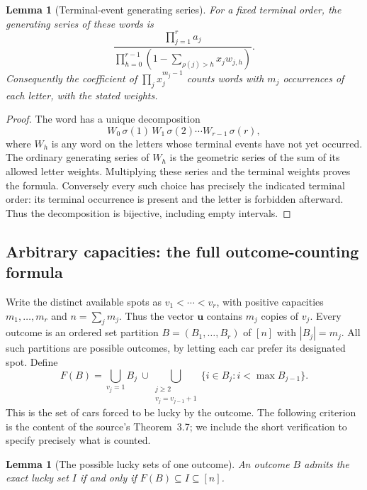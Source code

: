 \documentclass[11pt,a4paper]{article}
\newtheorem{lemma}[theorem]{Lemma}
\theoremstyle{definition}
\theoremstyle{remark}
\begin{document}
\begin{lemma}[Terminal-event generating series]
For a fixed terminal order, the generating series of these words is
\[
 \frac{\prod_{j=1}^r a_j}
 {\displaystyle\prod_{h=0}^{r-1}
       \left(1-\sum_{\rho(j)>h}x_jw_{j,h}\right)}.
\]
Consequently the coefficient of $\prod_jx_j^{m_j-1}$ counts words
with $m_j$ occurrences of each letter, with the stated weights.
\end{lemma}

\begin{proof}
The word has a unique decomposition
\[
 W_0\,\sigma(1)\,W_1\,\sigma(2)\cdots
 W_{r-1}\,\sigma(r),
\]
where $W_h$ is any word on the letters whose terminal events have not
yet occurred. The ordinary generating series of $W_h$ is the geometric
series of the sum of its allowed letter weights. Multiplying these
series and the terminal weights proves the formula. Conversely every
such choice has precisely the indicated terminal order: its terminal
occurrence is present and the letter is forbidden afterward. Thus the
decomposition is bijective, including empty intervals.
\end{proof}

\subsection{Arbitrary capacities: the full outcome-counting formula}

Write the distinct available spots as $v_1<\cdots<v_r$, with positive
capacities $m_1,\ldots,m_r$ and $n=\sum_jm_j$. Thus the vector
$\boldsymbol u$ contains $m_j$ copies of $v_j$. Every outcome is an
ordered set partition $B=(B_1,\ldots,B_r)$ of $[n]$ with $|B_j|=m_j$.
All such partitions are possible outcomes, by letting each car prefer
its designated spot. Define
\[
 F(B)=\bigcup_{v_j=1} B_j\ \cup
 \bigcup_{\substack{j\ge2\\v_j=v_{j-1}+1}}
       \{i\in B_j:i<\max B_{j-1}\}.
\]
This is the set of cars forced to be lucky by the outcome. The following
criterion is the content of the source's Theorem~3.7; we include the
short verification to specify precisely what is counted.

\begin{lemma}[The possible lucky sets of one outcome]
An outcome $B$ admits the exact lucky set $I$ if and only if
$F(B)\subseteq I\subseteq[n]$.
\end{lemma}
\end{document}
